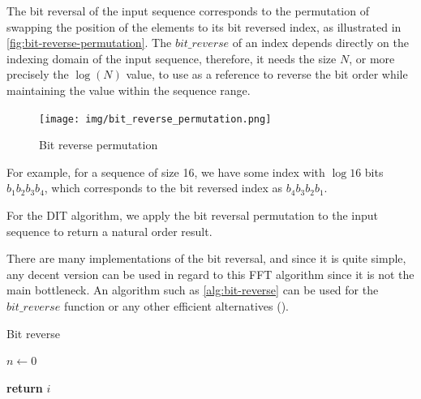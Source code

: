 \documentclass[
  oneside,
  11pt, a4paper,
  footinclude=true,
  headinclude=true,
  cleardoublepage=empty
]{scrbook}
\begin{document}
The bit reversal of the input sequence corresponds to the permutation of swapping the position of the elements to its bit reversed index, as illustrated in \autoref{fig:bit-reverse-permutation}. The $bit\_reverse$ of an index depends directly on the indexing domain of the input sequence, therefore, it needs the size $N$, or more precisely the $\log{(N)}$ value, to use as a reference to reverse the bit order while maintaining the value within the sequence range.

\begin{figure}[h] 
    \centering
    \texttt{[image: img/bit\_reverse\_permutation.png]}
    \caption{Bit reverse permutation}
    \label{fig:bit-reverse-permutation}
\end{figure}

For example, for a sequence of size 16, we have some index with $\log{16}$ bits $b_1 b_2 b_3 b_4$, which corresponds to the bit reversed index as $b_4 b_3 b_2 b_1$.

For the DIT algorithm, we apply the bit reversal permutation to the input sequence to return a natural order result.

There are many implementations of the bit reversal, and since it is quite simple, any decent version can be used in regard to this FFT algorithm since it is not the main bottleneck. An algorithm such as \autoref{alg:bit-reverse} can be used for the $bit\_reverse$ function or any other efficient alternatives (\cite{prado2004new}).
\newline 

\begin{algorithm}[H]
    \caption{Bit reverse} \label{alg:bit-reverse}

    $n \gets 0$ 
    
    \textbf{return} $i$\;
\end{algorithm}
\end{document}
